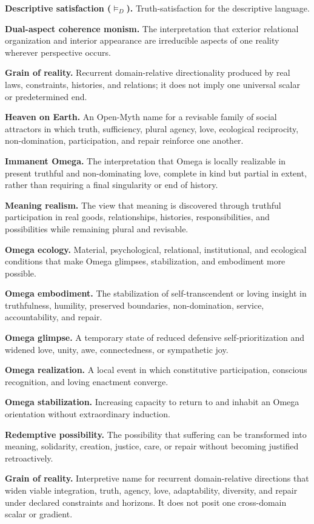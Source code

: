 \documentclass[
  11pt,
]{article}
\begin{document}
\textbf{Descriptive satisfaction (\(\vDash_D\)).} Truth-satisfaction for
the descriptive language.

\textbf{Dual-aspect coherence monism.} The interpretation that exterior
relational organization and interior appearance are irreducible aspects
of one reality wherever perspective occurs.

\textbf{Grain of reality.} Recurrent domain-relative directionality
produced by real laws, constraints, histories, and relations; it does
not imply one universal scalar or predetermined end.

\textbf{Heaven on Earth.} An Open-Myth name for a revisable family of
social attractors in which truth, sufficiency, plural agency, love,
ecological reciprocity, non-domination, participation, and repair
reinforce one another.

\textbf{Immanent Omega.} The interpretation that Omega is locally
realizable in present truthful and non-dominating love, complete in kind
but partial in extent, rather than requiring a final singularity or end
of history.

\textbf{Meaning realism.} The view that meaning is discovered through
truthful participation in real goods, relationships, histories,
responsibilities, and possibilities while remaining plural and
revisable.

\textbf{Omega ecology.} Material, psychological, relational,
institutional, and ecological conditions that make Omega glimpses,
stabilization, and embodiment more possible.

\textbf{Omega embodiment.} The stabilization of self-transcendent or
loving insight in truthfulness, humility, preserved boundaries,
non-domination, service, accountability, and repair.

\textbf{Omega glimpse.} A temporary state of reduced defensive
self-prioritization and widened love, unity, awe, connectedness, or
sympathetic joy.

\textbf{Omega realization.} A local event in which constitutive
participation, conscious recognition, and loving enactment converge.

\textbf{Omega stabilization.} Increasing capacity to return to and
inhabit an Omega orientation without extraordinary induction.

\textbf{Redemptive possibility.} The possibility that suffering can be
transformed into meaning, solidarity, creation, justice, care, or repair
without becoming justified retroactively.

\textbf{Grain of reality.} Interpretive name for recurrent
domain-relative directions that widen viable integration, truth, agency,
love, adaptability, diversity, and repair under declared constraints and
horizons. It does not posit one cross-domain scalar or gradient.
\end{document}
